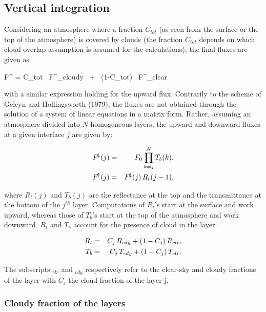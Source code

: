 %
\subsection{Vertical integration}
%

Considering an atmosphere where a fraction $C_{tot}$ (as seen from the surface or the top of the atmosphere) is covered by clouds (the fraction $C_{tot}$ depends on which cloud overlap assumption is assumed for the calculations), the final fluxes are given as

\medskip
\be
F^{\!\downarrow} = C_{tot} \, F^{\!\downarrow}_{cloudy} \, + \, (1-C_{tot}) \, F^{\!\downarrow}_{clear}
\label{ecmwf3110}
\ee
\medskip

\noindent with a similar expression holding for the upward flux. Contrarily to
the scheme of Geleyn and Hollingsworth (1979), the fluxes are not obtained
through the solution of a system of linear equations in a matrix form. Rather,
assuming an atmosphere divided into $N$ homogeneous layers, the upward and
downward fluxes at a given interface $j$ are given by:

\medskip
\begin{eqnarray}\label{ecmwf312}
F^{\!\downarrow}(j)&=&  F_0 \prod_{k=j}^N{T_b(k)}, \cr
F^{\!\uparrow}(j)  &=&  F^{\!\downarrow}(j) \, R_t(j-1),
\end{eqnarray}
\medskip

\noindent where $R_t(j)$ and $T_b(j)$ are the reflectance at the top and the
transmittance at the bottom of the $j^{th}$ layer. Computations of $R_t$'s
start at the surface and work upward, whereas those of $T_b$'s start at the top
of the atmosphere and work downward. $R_t$ and $T_b$ account for the presence of
cloud in the layer:

\medskip
\begin{eqnarray}\label{ecmwf313}
R_t &=& C_j \, R_{cdy} + (1 - C_j) \, R_{clr}, \cr
T_b &=& C_j \, T_{cdy} + (1 - C_j) \, T_{clr}.
\end{eqnarray}
\medskip

The subscripts $_{clr}$ and $_{cdy}$ respectively refer to the clear-sky and
cloudy fractions of the layer with $C_j$ the cloud fraction of the layer j.\\


%
\subsubsection{Cloudy fraction of the layers}
\label{subsubsection321}
%

